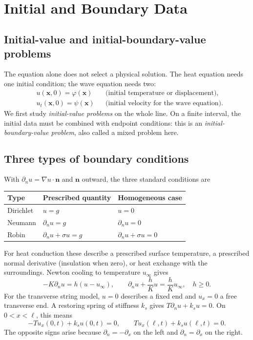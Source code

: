 \documentclass[11pt,a4paper]{article}
\newif\ifteachernotes\teachernotesfalse %
\newcommand{\teachernote}[1]{\ifteachernotes\par\smallskip
  \noindent\textit{Instructor note.} #1\par\smallskip\fi}
\begin{document}
\section{Initial and Boundary Data}
\subsection{Initial-value and initial-boundary-value problems}
The equation alone does not select a physical solution. The heat equation needs
one initial condition; the wave equation needs two:
\begin{align}
 &u(\mathbf{x},0)=\varphi(\mathbf{x})
       &&\text{(initial temperature or displacement)},\\
 &u_t(\mathbf{x},0)=\psi(\mathbf{x})
       &&\text{(initial velocity for the wave equation)}.
\end{align}
We first study \emph{initial-value problems} on the whole line. On a finite
interval, the initial data must be combined with endpoint conditions: this is an
\emph{initial-boundary-value problem}, also called a mixed problem here.

\subsection{Three types of boundary conditions}
With $\partial_nu=\nabla u\cdot\mathbf n$ and $\mathbf n$ outward, the three standard
conditions are
\begin{center}
\begin{tabular}{@{}lll@{}}
\toprule
Type & Prescribed quantity & Homogeneous case\\
\midrule
Dirichlet & $u=g$ & $u=0$\\
Neumann & $\partial_nu=g$ & $\partial_nu=0$\\
Robin & $\partial_nu+\sigma u=g$ & $\partial_nu+\sigma u=0$\\
\bottomrule
\end{tabular}
\end{center}
For heat conduction these describe a prescribed surface temperature, a prescribed
normal derivative (insulation when zero), or heat exchange with the surroundings.
Newton cooling to temperature $u_\infty$ gives
\begin{equation}
 -K\partial_nu=h(u-u_\infty),\qquad
 \partial_nu+\frac hK u=\frac hK u_\infty,\quad h\ge0.
\end{equation}
For the transverse string model, $u=0$ describes a fixed end and $u_x=0$ a free
transverse end. A restoring spring of stiffness $k_s$ gives
$T\partial_nu+k_su=0$. On $0<x<\ell$, this means
\begin{equation}
 -Tu_x(0,t)+k_su(0,t)=0,\qquad
 Tu_x(\ell,t)+k_su(\ell,t)=0.
\end{equation}
The opposite signs arise because $\partial_n=-\partial_x$ on the left and
$\partial_n=\partial_x$ on the right.
\teachernote{This fixes the endpoint orientation consistently. For smooth fixed-end
 solutions, $\varphi$ and $\psi$ must also satisfy the endpoint conditions; higher
 smoothness imposes further compatibility conditions.}
\end{document}
